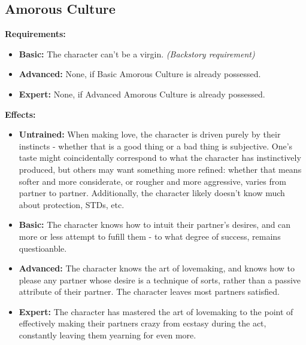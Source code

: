 \subsection{Amorous Culture}
\begin{table}[!ht]
\centering
{}
\end{table}
\textbf{Requirements:}
\begin{itemize}
	\item \textbf{Basic:} The character can't be a virgin. \textit{(Backstory requirement)}
	\item \textbf{Advanced:} None, if Basic Amorous Culture is already possessed.
	\item \textbf{Expert:} None, if Advanced Amorous Culture is already possessed.
\end{itemize}
\textbf{Effects:}
\begin{itemize}
	\item \textbf{Untrained:} When making love, the character is driven purely by their instincts - whether that is a good thing or a bad thing is subjective. One's taste might coincidentally correspond to what the character has instinctively produced, but others may want something more refined: whether that means softer and more considerate, or rougher and more aggressive, varies from partner to partner. Additionally, the character likely doesn't know much about protection, STDs, etc.
	\item \textbf{Basic:} The character knows how to intuit their partner's desires, and can more or less attempt to fufill them - to what degree of success, remains questioanble.
	\item \textbf{Advanced:} The character knows the art of lovemaking, and knows how to please any partner whose desire is a technique of sorts, rather than a passive attribute of their partner. The character leaves most partners satisfied.
	\item \textbf{Expert:} The character has mastered the art of lovemaking to the point of effectively making their partners crazy from ecstasy during the act, constantly leaving them yearning for even more.
\end{itemize}\newpage
